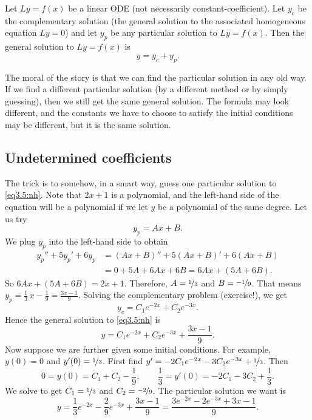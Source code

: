 \begin{theorem}
Let $Ly=f(x)$ be a linear ODE (not necessarily constant-coefficient).  Let $y_c$ be the complementary solution
(the general
solution to the associated homogeneous equation $Ly = 0$) and let $y_p$
be any particular solution to $Ly=f(x)$.  Then the general
solution to $Ly=f(x)$ is
\begin{equation*}
y = y_c + y_p.
\end{equation*}
\end{theorem}

The moral of the story is that we can find the particular solution in any old
way.  If we find a different particular solution (by a different method
or by simply guessing),
then we still get the same general solution.
The formula may 
look different, and the constants we have to choose to
satisfy
the initial conditions may be different, but it is the same solution.

\subsection{Undetermined coefficients}

The trick is to somehow, in a smart way, guess one particular solution to
\eqref{eq3.5:nh}.  Note that $2x+1$ is a polynomial, and the left-hand 
side of the equation will be a polynomial if we let $y$ be a polynomial of
the same degree.  Let us try
\begin{equation*}
y_p = Ax + B .
\end{equation*}
We plug $y_p$ into the left-hand side to obtain
\begin{equation*}
\begin{split}
y_p'' + 5y_p'+ 6y_p & =
(Ax+B)'' + 5(Ax+B)' + 6(Ax+B)
\\
& = 
0 + 5A + 6Ax + 6B = 6Ax+ (5A+6B) .
\end{split}
\end{equation*}
So $6Ax+(5A+6B) = 2x+1$.  Therefore, $A = \nicefrac{1}{3}$ and $B = \nicefrac{-1}{9}$.
That means
$y_p = \frac{1}{3}\, x - \frac{1}{9} = \frac{3x-1}{9}$.
Solving the complementary
problem (exercise!), we get
\begin{equation*}
y_c = C_1 e^{-2x} + C_2 e^{-3x}.
\end{equation*}
Hence the general solution to \eqref{eq3.5:nh} is
\begin{equation*}
y = C_1 e^{-2x} + C_2 e^{-3x} + \frac{3x-1}{9} .
\end{equation*}
Now suppose we are further given some initial conditions.  For example, $y(0) = 0$ and
$y'(0) = \nicefrac{1}{3}$.  First find $y' = - 2C_1 e^{-2x} - 3C_2 e^{-3x}
+ \nicefrac{1}{3}$.
Then
\begin{equation*}
0 = y(0) = C_1 + C_2 -\frac{1}{9} , \qquad
\frac{1}{3} = y'(0) = - 2C_1 - 3C_2 + \frac{1}{3} .
\end{equation*}
We solve to get $C_1 = \nicefrac{1}{3}$ and $C_2 = \nicefrac{-2}{9}$.
The particular solution we want is
\begin{equation*}
y = \frac{1}{3} e^{-2x} - \frac{2}{9} e^{-3x} + \frac{3x-1}{9} =
\frac{3 e^{-2x} - 2 e^{-3x} + 3x-1}{9} .
\end{equation*}

